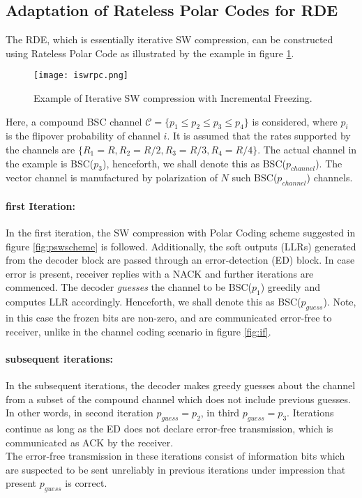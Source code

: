 \documentclass[
11pt, %
a4paper, %
oneside, %
headinclude,footinclude, %
BCOR5mm, %
]{scrartcl}
\begin{document}
\subsection{Adaptation of Rateless Polar Codes for RDE}\label{adapt}
The RDE, which is essentially iterative SW compression, can be constructed using Rateless Polar Code as illustrated by the example in figure \ref{fig:iswrpc}.
\begin{figure}[h]
 \begin{center}
    \texttt{[image: iswrpc.png]}
  \end{center}
  \caption{Example of Iterative SW compression with Incremental Freezing.}
  \label{fig:iswrpc}
\end{figure} 
Here, a compound BSC channel $\mathcal{C}=\{ p_1 \leq p_2 \leq p_3 \leq p_4\}$ is considered, where $p_i$ is the flipover probability of channel $i$. It is assumed that the rates supported by the channels are $\{ R_1=R, R_2= R/2,R_3= R/3,R_4= R/4\}$. The actual channel in the example is BSC($p_3$), henceforth, we shall denote this as BSC($p_{channel}$). The vector channel is manufactured by polarization of $N$ such BSC($p_{channel}$) channels.
\paragraph{first Iteration:} In the first iteration, the SW compression with Polar Coding scheme suggested in figure \ref{fig:pswscheme} is followed. Additionally, the soft outputs (LLRs) generated from the decoder block are passed through an error-detection (ED) block. In case error is present, receiver replies with a NACK and further iterations are commenced. The decoder \emph{guesses} the channel to be BSC($p_1$) greedily and computes LLR accordingly. Henceforth, we shall denote this as BSC($p_{guess}$). Note, in this case the frozen bits are non-zero, and are communicated error-free to receiver, unlike in the channel coding scenario in figure \ref{fig:if}.
\paragraph{subsequent iterations:}In the subsequent iterations, the decoder makes greedy guesses about the channel from a subset of the compound channel which does not include previous guesses. In other words, in second iteration $p_{guess}=p_2$, in third $p_{guess}=p_3$. Iterations continue as long as the ED does not declare error-free transmission, which is communicated as ACK by the receiver.\\
The error-free transmission in these iterations consist of information bits which are suspected to be sent unreliably in previous iterations under impression that present $p_{guess}$ is correct. 
\end{document}
